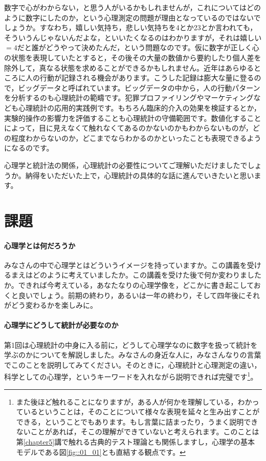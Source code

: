 \documentclass{ltjsbook}
\begin{document}
数字で心がわからない，と思う人がいるかもしれませんが，これについてはどのように数字にしたのか，という心理測定の問題が理由となっているのではないでしょうか。すなわち，嬉しい気持ち，悲しい気持ちを4とか23とか言われても，そういうんじゃないんだよな，といいたくなるのはわかりますが，それは嬉しい$=4$だと誰がどうやって決めたんだ，という問題なのです。仮に数字が正しく心の状態を表現していたとすると，その後その大量の数値から要約したり個人差を除外して，真なる状態を求めることができるかもしれません。近年はあらゆるところに人の行動が記録される機会があります。こうした記録は膨大な量に登るので，ビッグデータと呼ばれています。ビッグデータの中から，人の行動パターンを分析するのも心理統計の範疇です。犯罪プロファイリングやマーケティングなども心理統計の応用的実践例です。もちろん臨床的介入の効果を検証するとか，実験的操作の影響力を評価することも心理統計の守備範囲です。数値化することによって，目に見えなくて触れなくてあるのかないのかもわからないものが，どの程度わからないのか，どこまでならわかるのかといったことも表現できるようになるのです。

心理学と統計法の関係，心理統計の必要性についてご理解いただけましたでしょうか。納得をいただいた上で，心理統計の具体的な話に進んでいきたいと思います。
\section{課題}
\paragraph{心理学とは何だろうか}
みなさんの中で心理学とはどういうイメージを持っていますか。この講義を受けるまえはどのように考えていましたか。この講義を受けた後で何か変わりましたか。できれば今考えている，あなたなりの心理学像を，どこかに書き起こしておくと良いでしょう。前期の終わり，あるいは一年の終わり，そして四年後にそれがどう変わるかを楽しみに。
\paragraph{心理学にどうして統計が必要なのか}
第1回は心理統計の中身に入る前に，どうして心理学なのに数字を扱って統計を学ぶのかについてを解説しました。みなさんの身近な人に，みなさんなりの言葉でこのことを説明してみてください。そのときに，心理統計と心理測定の違い，科学としての心理学，というキーワードを入れながら説明できれば完璧です\footnote{また後ほど触れることになりますが，ある人が何かを理解している，わかっているということは，そのことについて様々な表現を延々と生み出すことができる，ということでもあります。もし言葉に詰まったり，うまく説明できないことがあれば，そこの理解ができていないと考えられます。このことは第\ref{chapter5}講で触れる古典的テスト理論とも関係しますし，心理学の基本モデルである図\ref{fig::01_01}とも直結する観点です。}。
\end{document}
